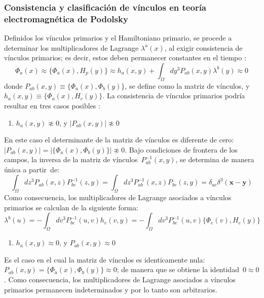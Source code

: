 \documentclass[a4paper,12pt]{article}
\begin{document}
\subsubsection{Consistencia y clasificación de vínculos en teoría electromagnética de Podolsky}
Definidos los vínculos primarios y el \mbox{Hamiltoniano} primario, se procede a determinar los multiplicadores de Lagrange $\lambda^a(x)$, al exigir consistencia de vínculos primarios; es decir, estos deben permanecer \mbox{constantes} en el tiempo \cite{dirac,puebla,Merilin}:
\begin{equation}
\dot{\Phi}_a(x)\approx\{\Phi_a(x),H_p(y)\}\approx h_a(x,y)+\int_\Omega dy^3P_{ab}(x,y)\lambda^b(y)\approx0
\end{equation}
donde \mbox{$P_{ab}(x,y)\equiv\{\Phi_a(x),\Phi_b(y)\}$}, se define como la matriz de vínculos, \mbox{y\mbox{ $h_a(x,y)\equiv\{\Phi_a(x),H_c(y)\}$}}. La consistencia de vínculos primarios podría resultar en tres casos posibles \cite{dirac,puebla,Merilin}:
\begin{enumerate}
 \item [\fbox{1.}] $h_a(x,y)\not\approx0$, y $|P_{ab}(x,y)|\not\approx0$ 
\end{enumerate}
En este caso el determinante de la matriz de vínculos es diferente de cero: \mbox{$|P_{ab}(x,y)|=|\{\Phi_a(x),\Phi_b(y)\}|\not\approx0$}. Bajo condiciones de \mbox{frontera} de los campos, la inversa de la matriz de \mbox{vínculos $P_{ab}^{-1}(x,y)$,} se determina de manera única a \mbox{partir de:}    
\begin{equation}
\int_\Omega dz^3P_{ab}(x,z)P_{bc}^{-1}(z,y)=\int_\Omega dz^3P_{ab}^{-1}(x,z)P_{bc}(z,y)=\delta_{ac}\delta^3(\textbf{x}-\textbf{y})
\end{equation}
Como consecuencia, los multiplicadores de Lagrange asociados a vínculos primarios se calculan de la siguiente forma:
\begin{equation}
\lambda^b(u)=-\int_\Omega dv^3P_{be}^{-1}(u,v)h_e(v,y)=-\int_\Omega dv^3P_{be}^{-1}(u,v)\{\Phi_e(v),H_c(y)\} 
\end{equation}
\begin{enumerate}
 \item [\fbox{2.}] $h_a(x,y)\approx0$, y $P_{ab}(x,y)\approx0$ 
\end{enumerate}
Es el caso en el cual la matriz de vínculos es identicamente \mbox{nula: \mbox{$P_{ab}(x,y)=\{\Phi_a(x),\Phi_b(y)\}\approx0$}}; de manera que se obtiene la \mbox{identidad \mbox{$0\approx0$}.} Como consecuencia, los multiplicadores de Lagrange asociados a vínculos primarios permanecen indeterminados y por lo tanto son arbitrarios.
\end{document}
